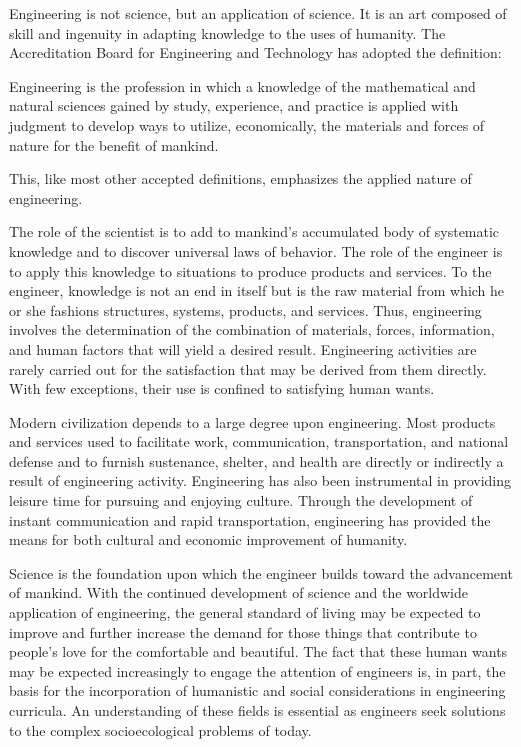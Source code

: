 Engineering is not science, but an application of science. It is an art composed of skill and ingenuity in adapting knowledge to the uses of humanity. The Accreditation Board for Engineering and Technology has adopted the definition:

Engineering is the profession in which a knowledge of the mathematical and natural sciences gained by study, experience, and practice is applied with judgment to develop ways to utilize, economically, the materials and forces of nature for the benefit of mankind.

This, like most other accepted definitions, emphasizes the applied nature of engineering.

The role of the scientist is to add to mankind’s accumulated body of systematic knowledge and to discover universal laws of behavior. The role of the engineer is to apply this knowledge to situations to produce products and services. To the engineer, knowledge is not an end in itself but is the raw material from which he or she fashions structures, systems, products, and services. Thus, engineering involves the determination of the combination of materials, forces, information, and human factors that will yield a desired result. Engineering activities are rarely carried out for the satisfaction that may be derived from them directly. With few exceptions, their use is confined to satisfying human wants.

Modern civilization depends to a large degree upon engineering. Most products and services used to facilitate work, communication, transportation, and national defense and to furnish sustenance, shelter, and health are directly or indirectly a result of engineering activity. Engineering has also been instrumental in providing leisure time for pursuing and enjoying culture. Through the development of instant communication and rapid transportation, engineering has provided the means for both cultural and economic improvement of humanity.

Science is the foundation upon which the engineer builds toward the advancement of mankind. With the continued development of science and the worldwide application of engineering, the general standard of living may be expected to improve and further increase the demand for those things that contribute to people’s love for the comfortable and beautiful. The fact that these human wants may be expected increasingly to engage the attention of engineers is, in part, the basis for the incorporation of humanistic and social considerations in engineering curricula. An understanding of these fields is essential as engineers seek solutions to the complex socioecological problems of today.


